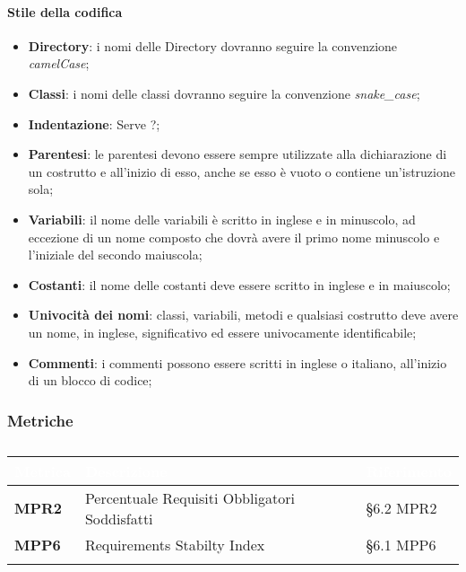 \paragraph{Stile della codifica}
\begin{itemize}
	\item \textbf{Directory}: i nomi delle Directory dovranno seguire la convenzione \emph{camelCase};
	\item \textbf{Classi}: i nomi delle classi dovranno seguire la convenzione \emph{snake\_case};
	\item \textbf{Indentazione}: Serve ?;
	\item \textbf{Parentesi}: le parentesi devono essere sempre utilizzate alla dichiarazione di un costrutto e all'inizio di esso, anche se esso è vuoto o contiene un'istruzione sola;
	\item \textbf{Variabili}: il nome delle variabili è scritto in inglese e in minuscolo, ad eccezione di un nome composto che dovrà avere il primo nome minuscolo e l'iniziale del secondo maiuscola;
	\item \textbf{Costanti}: il nome delle costanti deve essere scritto in inglese e in maiuscolo;
	\item \textbf{Univocità dei nomi}: classi, variabili, metodi e qualsiasi costrutto deve avere un nome, in inglese, significativo ed essere univocamente identificabile; 
	\item \textbf{Commenti}: i commenti possono essere scritti in inglese o italiano, all'inizio di un blocco di codice;
\end{itemize}


\subsubsection{Metriche}
\setlength{\freewidth}{\dimexpr\textwidth-0\tabcolsep}
\renewcommand{\arraystretch}{1.5}
\setlength{\aboverulesep}{0pt}
\setlength{\belowrulesep}{0pt}
\begin{longtable}{L{.22\freewidth} L{.4\freewidth} L{.2\freewidth}}
	\toprule
	\textcolor{white}{\textbf{Metrica}}&
	\textcolor{white}{\textbf{Descrizione}}&	
	\textcolor{white}{\textbf{Riferimento}}\\	
	\toprule
	\endhead
	
	\textbf{MPR2} & Percentuale Requisiti Obbligatori Soddisfatti & \S 6.2 MPR2 \\
	\textbf{MPP6} & Requirements Stabilty Index & \S 6.1 MPP6 \\
	
	\bottomrule
	\caption{}
\end{longtable}


